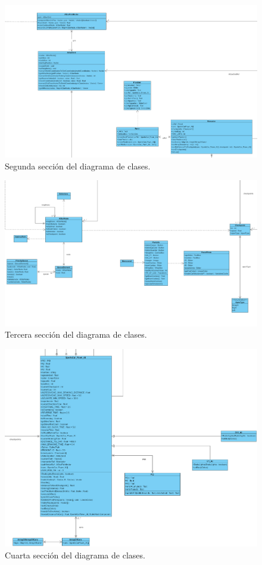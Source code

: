 \begin{figure}[H]
    \centering
    \includegraphics[width=\textwidth]{imagenes/classDiagram2.png}
    \caption{Segunda sección del diagrama de clases.}
\end{figure}

\begin{figure}[H]
    \centering
    \includegraphics[width=\textwidth]{imagenes/classDiagram3.png}
    \caption{Tercera sección del diagrama de clases.}
\end{figure}

\begin{figure}[H]
    \centering
    \includegraphics[width=\textwidth]{imagenes/classDiagram4.png}
    \caption{Cuarta sección del diagrama de clases.}
\end{figure}

